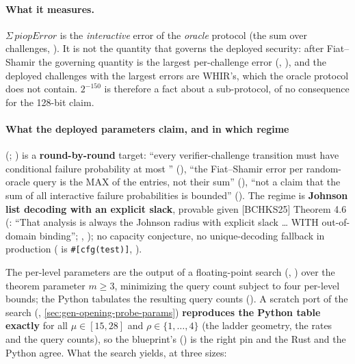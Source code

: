 \paragraph{What it measures.} $Σ\,\mathit{piopError}$ is the \emph{interactive} error of the
\emph{oracle} protocol (the sum over challenges, ). It is not the quantity that governs
the deployed security: after Fiat--Shamir the governing quantity is the largest per-challenge error
(, ), and the deployed challenges with the largest errors are
WHIR's, which the oracle protocol does not contain. $2^{-150}$ is therefore a fact about a
sub-protocol, of no consequence for the 128-bit claim.

\paragraph{What the deployed parameters claim, and in which regime}\label{sec:gen-opening-deployed-claim}

\begin{sloppypar}
 (; ) is a
\textbf{round-by-round} target: ``every verifier-challenge transition must have conditional failure
probability at most '' (), ``the Fiat--Shamir error
per random-oracle query is the MAX of the entries, not their sum'' (), ``not a claim that
the sum of all interactive failure probabilities is bounded'' (). The regime is
\textbf{Johnson list decoding with an explicit slack}, provable given [BCHKS25] Theorem 4.6
(: ``That analysis is always the Johnson radius with explicit slack  … WITH
out-of-domain binding''; 
, ); no capacity
conjecture, no unique-decoding fallback in production ( is
\texttt{\#[cfg(test)]}, ).
\end{sloppypar}

The per-level parameters are the output of a floating-point search (,
) over the theorem parameter $m ≥ 3$, minimizing the query count subject to four
per-level bounds; the Python tabulates the resulting query counts (). A scratch port of
the search (, \cref{sec:gen-opening-probe-params}) \textbf{reproduces the Python
table exactly} for all $μ ∈ [15, 28]$ and $ρ ∈ \{1, …, 4\}$ (the ladder geometry, the rates and the
query counts), so the blueprint's 
() is the right pin and the Rust and the Python agree. What the search yields, at three
sizes:

